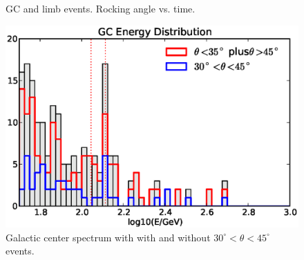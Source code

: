 \documentclass[aps,twocolumn,prd,superscriptaddress,showpacs,nofootinbib,fixfloat]{revtex4}
\begin{document}
\begin{figure}
  \begin{center}
  \end{center}
  \caption{GC and limb events. Rocking angle vs. time.}
  \label{fig:rockTime}
\end{figure}

\begin{figure}
  \centering
  \includegraphics[width=1.0\linewidth]{plots/gc_energy.eps}
  \caption{Galactic center spectrum with with and without
  $30^\circ<\theta<45^\circ$ events.}
  \label{fig:GCevents}
\end{figure}
\end{document}

